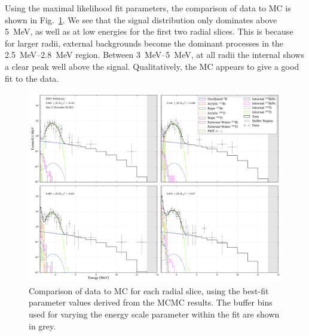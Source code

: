 Using the maximal likelihood fit parameters, the comparison of data to MC is shown in Fig.~\ref{fig:solar_data_mc_slices_comparison}. We see that the \beight{} signal distribution only dominates above \SI{5}{\MeV}, as well as at low energies for the first two radial slices. This is because for larger radii, external backgrounds become the dominant processes in the \SIrange{2.5}{2.8}{\MeV} region. Between \SIrange{3}{5}{\MeV}, at all radii the internal  shows a clear peak well above the \beight{} signal. Qualitatively, the MC appears to give a good fit to the data.

\begin{figure}
    \centering
    \includegraphics[width=\textwidth]{6_SolarAnalysis/images/data_mc_fit_plot_1D_energy_r3_slices_log_maxlh.pdf}
    \caption[Comparison of data to MC for each radial slice]
    {Comparison of data to MC for each radial slice, using the best-fit parameter values derived from the MCMC results. The buffer bins used for varying the energy scale parameter within the fit are shown in grey.}
    \label{fig:solar_data_mc_slices_comparison}
\end{figure}


